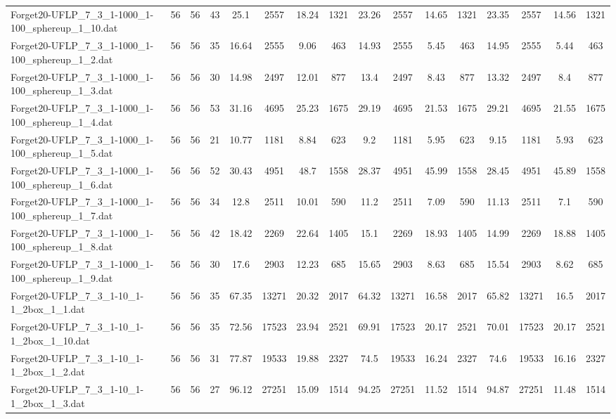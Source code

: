 \begin{sidewaystable}[!ht]
{\begin{tabular}{lccccccccccccccc}
Forget20-UFLP\_7\_3\_1-1000\_1-100\_sphereup\_1\_10.dat & 56 & 56 & 43 & 25.1 & 2557 & 18.24 & 1321 & 23.26 & 2557 & 14.65 & 1321 & 23.35 & 2557 &  \textcolor{blue2}{14.56} & 1321 \\
Forget20-UFLP\_7\_3\_1-1000\_1-100\_sphereup\_1\_2.dat & 56 & 56 & 35 & 16.64 & 2555 & 9.06 & 463 & 14.93 & 2555 & 5.45 & 463 & 14.95 & 2555 & 5.44 & 463 \\
Forget20-UFLP\_7\_3\_1-1000\_1-100\_sphereup\_1\_3.dat & 56 & 56 & 30 & 14.98 & 2497 & 12.01 & 877 & 13.4 & 2497 & 8.43 & 877 & 13.32 & 2497 & 8.4 & 877 \\
Forget20-UFLP\_7\_3\_1-1000\_1-100\_sphereup\_1\_4.dat & 56 & 56 & 53 & 31.16 & 4695 & 25.23 & 1675 & 29.19 & 4695 &  \textcolor{blue2}{21.53} & 1675 & 29.21 & 4695 & 21.55 & 1675 \\
Forget20-UFLP\_7\_3\_1-1000\_1-100\_sphereup\_1\_5.dat & 56 & 56 & 21 & 10.77 & 1181 & 8.84 & 623 & 9.2 & 1181 & 5.95 & 623 & 9.15 & 1181 & 5.93 & 623 \\
Forget20-UFLP\_7\_3\_1-1000\_1-100\_sphereup\_1\_6.dat & 56 & 56 & 52 & 30.43 & 4951 & 48.7 & 1558 &  \textcolor{blue2}{28.37} & 4951 & 45.99 & 1558 & 28.45 & 4951 & 45.89 & 1558 \\
Forget20-UFLP\_7\_3\_1-1000\_1-100\_sphereup\_1\_7.dat & 56 & 56 & 34 & 12.8 & 2511 & 10.01 & 590 & 11.2 & 2511 & 7.09 & 590 & 11.13 & 2511 & 7.1 & 590 \\
Forget20-UFLP\_7\_3\_1-1000\_1-100\_sphereup\_1\_8.dat & 56 & 56 & 42 & 18.42 & 2269 & 22.64 & 1405 & 15.1 & 2269 & 18.93 & 1405 & 14.99 & 2269 & 18.88 & 1405 \\
Forget20-UFLP\_7\_3\_1-1000\_1-100\_sphereup\_1\_9.dat & 56 & 56 & 30 & 17.6 & 2903 & 12.23 & 685 & 15.65 & 2903 & 8.63 & 685 & 15.54 & 2903 & 8.62 & 685 \\
Forget20-UFLP\_7\_3\_1-10\_1-1\_2box\_1\_1.dat & 56 & 56 & 35 & 67.35 & 13271 & 20.32 & 2017 & 64.32 & 13271 & 16.58 & 2017 & 65.82 & 13271 & 16.5 & 2017 \\
Forget20-UFLP\_7\_3\_1-10\_1-1\_2box\_1\_10.dat & 56 & 56 & 35 & 72.56 & 17523 & 23.94 & 2521 & 69.91 & 17523 &  \textcolor{blue2}{20.17} & 2521 & 70.01 & 17523 &  \textcolor{blue2}{20.17} & 2521 \\
Forget20-UFLP\_7\_3\_1-10\_1-1\_2box\_1\_2.dat & 56 & 56 & 31 & 77.87 & 19533 & 19.88 & 2327 & 74.5 & 19533 & 16.24 & 2327 & 74.6 & 19533 &  \textcolor{blue2}{16.16} & 2327 \\
Forget20-UFLP\_7\_3\_1-10\_1-1\_2box\_1\_3.dat & 56 & 56 & 27 & 96.12 & 27251 & 15.09 & 1514 & 94.25 & 27251 & 11.52 & 1514 & 94.87 & 27251 & 11.48 & 1514 \\

\end{tabular}}
\end{sidewaystable}
